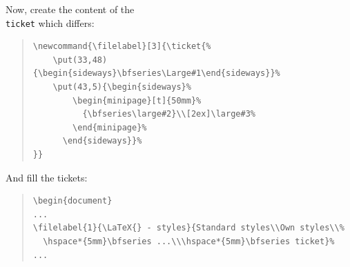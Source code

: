 \documentclass[aspectratio=1610,hyperref={pdfpagelabels=false}]{beamer}
\def\code#1{\texttt{#1}}
\newcommand{\ticket}{{\code{ticket.sty}}}
\newcommand{\bs}{{\mtt\\}}
\begin{document}
\begin{frame}[fragile]
\vspace*{10mm}
Now, create the content of the \code{\bs{}ticket} which differs:
\begin{quote}
    \begin{minipage}[t]{0.5\textwidth}
      {\scriptsize
\begin{verbatim}
\newcommand{\filelabel}[3]{\ticket{%
    \put(33,48){\begin{sideways}\bfseries\Large#1\end{sideways}}%
    \put(43,5){\begin{sideways}%
        \begin{minipage}[t]{50mm}%
          {\bfseries\large#2}\\[2ex]\large#3%
        \end{minipage}%
      \end{sideways}}%
}}
\end{verbatim}
        }
    \end{minipage}
\end{quote}

And fill the tickets:
\begin{quote}
    \begin{minipage}[t]{0.5\textwidth}
      {\scriptsize
\begin{verbatim}
\begin{document}
...
\filelabel{1}{\LaTeX{} - styles}{Standard styles\\Own styles\\%
  \hspace*{5mm}\bfseries ...\\\hspace*{5mm}\bfseries ticket}%
...
\end{verbatim}
        }
    \end{minipage}
\end{quote}
\end{frame}
\end{document}
